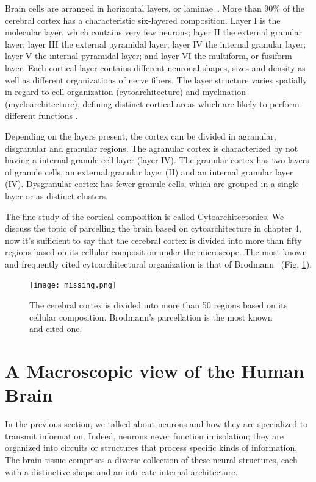Brain cells are arranged in horizontal layers, or laminae~\cite{Waehnert2014}.
More than 90\% of the cerebral cortex has a characteristic six-layered composition\cite{RandS.SwensonM.D.2006}.
Layer I is the molecular
layer, which contains very few neurons; layer II the external granular layer;
layer III the external pyramidal layer; layer IV the internal granular layer;
layer V the internal pyramidal layer; and layer VI the multiform, or fusiform
layer. Each cortical layer contains different neuronal shapes, sizes and density
as well as different organizations of nerve fibers\cite{RandS.SwensonM.D.2006}.
The layer structure varies spatially in regard to cell organization (cytoarchitecture) and 
myelination (myeloarchitecture), defining distinct cortical areas which are
likely to perform different functions \cite{Waehnert2014, Bok1929}. 

Depending on the layers present, the cortex can be divided in agranular,
disgranular and granular regions\cite{Mesulam1982}. The agranular cortex is characterized by not
having a internal granule cell layer (layer IV). The granular cortex has two 
layers of granule cells, an external granular layer (II) and an internal granular
layer (IV). Dysgranular cortex has fewer granule cells, which are grouped in a
single layer or as distinct clusters.

The fine study of the cortical composition is called Cytoarchitectonics. We 
discuss the topic of parcelling the brain based on cytoarchitecture in chapter
4, now it's sufficient to say that the cerebral cortex is divided into more than
fifty regions based on its cellular composition under the microscope. The most
known and frequently cited cytoarchitectural organization is that of
Brodmann~\cite{Brodmann1909} (Fig. \ref{fig:brodmann_small}).

\begin{figure}[h]
    \texttt{[image: missing.png]}
    \caption{The cerebral cortex is divided into more than 50 regions based on
             its cellular composition. Brodmann's\cite{Brodmann1909}
             parcellation is the most known and cited one.}
    \label{fig:brodmann_small}
\end{figure}

\section{A Macroscopic view of the Human Brain}
In the previous section, we talked about neurons and how they are specialized
to transmit information. Indeed, neurons never function in isolation; they are
organized into circuits or structures that process specific kinds of information.
The brain tissue comprises a diverse collection of these neural structures,
each with a distinctive shape and an intricate internal architecture.

